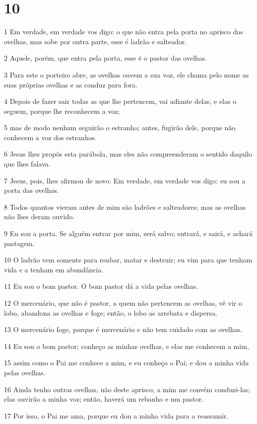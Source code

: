 \chapter{10}

\par 1 Em verdade, em verdade vos digo: o que não entra pela porta no aprisco das ovelhas, mas sobe por outra parte, esse é ladrão e salteador.
\par 2 Aquele, porém, que entra pela porta, esse é o pastor das ovelhas.
\par 3 Para este o porteiro abre, as ovelhas ouvem a sua voz, ele chama pelo nome as suas próprias ovelhas e as conduz para fora.
\par 4 Depois de fazer sair todas as que lhe pertencem, vai adiante delas, e elas o seguem, porque lhe reconhecem a voz;
\par 5 mas de modo nenhum seguirão o estranho; antes, fugirão dele, porque não conhecem a voz dos estranhos.
\par 6 Jesus lhes propôs esta parábola, mas eles não compreenderam o sentido daquilo que lhes falava.
\par 7 Jesus, pois, lhes afirmou de novo: Em verdade, em verdade vos digo: eu sou a porta das ovelhas.
\par 8 Todos quantos vieram antes de mim são ladrões e salteadores; mas as ovelhas não lhes deram ouvido.
\par 9 Eu sou a porta. Se alguém entrar por mim, será salvo; entrará, e sairá, e achará pastagem.
\par 10 O ladrão vem somente para roubar, matar e destruir; eu vim para que tenham vida e a tenham em abundância.
\par 11 Eu sou o bom pastor. O bom pastor dá a vida pelas ovelhas.
\par 12 O mercenário, que não é pastor, a quem não pertencem as ovelhas, vê vir o lobo, abandona as ovelhas e foge; então, o lobo as arrebata e dispersa.
\par 13 O mercenário foge, porque é mercenário e não tem cuidado com as ovelhas.
\par 14 Eu sou o bom pastor; conheço as minhas ovelhas, e elas me conhecem a mim,
\par 15 assim como o Pai me conhece a mim, e eu conheço o Pai; e dou a minha vida pelas ovelhas.
\par 16 Ainda tenho outras ovelhas, não deste aprisco; a mim me convém conduzi-las; elas ouvirão a minha voz; então, haverá um rebanho e um pastor.
\par 17 Por isso, o Pai me ama, porque eu dou a minha vida para a reassumir.
